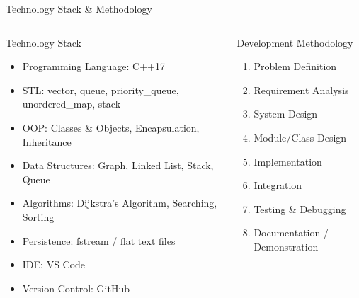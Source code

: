 \documentclass[aspectratio=169,11pt]{beamer}
\begin{document}
\begin{frame}{Technology Stack \& Methodology}

\small

\vspace{-3mm}

\begin{columns}[T,totalwidth=\textwidth]


\begin{block}{Technology Stack}
\footnotesize
\begin{itemize}\itemsep1pt
\item Programming Language: C++17
\item STL: vector, queue, priority\_queue, unordered\_map, stack
\item OOP: Classes \& Objects, Encapsulation, Inheritance
\item Data Structures: Graph, Linked List, Stack, Queue
\item Algorithms: Dijkstra's Algorithm, Searching, Sorting
\item Persistence: fstream / flat text files
\item IDE: VS Code
\item Version Control: GitHub
\end{itemize}
\end{block}


\begin{block}{Development Methodology}
\begin{enumerate}\itemsep1pt
\item Problem Definition
\item Requirement Analysis
\item System Design
\item Module/Class Design
\item Implementation
\item Integration
\item Testing \& Debugging
\item Documentation / Demonstration
\end{enumerate}
\end{block}

\end{columns}

\vspace{1mm}

\begin{center}
\footnotesize

\end{center}

\end{frame}
\end{document}
